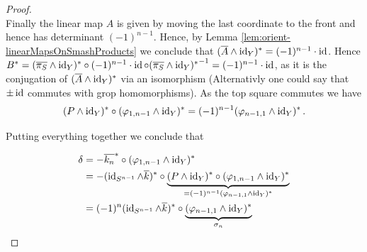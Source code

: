 \begin{proof}
\begin{equation*}
	\end{equation*}
	 Finally the linear map $A$ is given by moving the last coordinate to the front and hence has determinant $(-1)^{n-1}$.  Hence, by Lemma \ref{lem:orient-linearMapsOnSmashProducts} we conclude that $(\overline{A}\wedge \operatorname{\mathrm{id}}_Y)^*=(-1)^{n-1}\cdot \operatorname{\mathrm{id}}$. Hence $B^*=(\overline{\pi_S}\wedge \operatorname{\mathrm{id}}_Y)^*\circ (-1)^{n-1}\cdot \operatorname{\mathrm{id}}\circ {(\overline{\pi_S}\wedge \operatorname{\mathrm{id}}_Y)^*}^{-1}=(-1)^{n-1}\cdot \operatorname{\mathrm{id}}$, as it is the conjugation of $(\overline{A}\wedge \operatorname{\mathrm{id}}_Y)^*$ via an isomorphism (Alternativly one could say that $\pm \operatorname{\mathrm{id}}$ commutes with grop homomorphisms). As the top square commutes we have
	\begin{equation*}
		 (P\wedge \operatorname{\mathrm{id}}_Y)^*\circ (\varphi_{1,n-1}\wedge \operatorname{\mathrm{id}}_Y)^*=(-1)^{n-1}(\varphi_{n-1,1}\wedge \operatorname{\mathrm{id}}_Y)^*\,.
	\end{equation*} 
	
	Putting everything together we conclude that 
	
	\begin{align*}
		\delta 
		&=-\overline{k_n}^*\circ (\varphi_{1,n-1}\wedge \operatorname{\mathrm{id}}_Y)^* \\
		&=-(\operatorname{\mathrm{id}}_{S^{n-1}} \wedge \overline{k})^*\circ \underbrace{(P\wedge \operatorname{\mathrm{id}}_Y)^*\circ  (\varphi_{1,n-1}\wedge \operatorname{\mathrm{id}}_Y)^*}_{=(-1)^{n-1}(\varphi_{n-1,1}\wedge \operatorname{\mathrm{id}}_Y)^*}\\
		&=(-1)^{n}(\operatorname{\mathrm{id}}_{S^{n-1}}\wedge \overline{k})^*\circ \underbrace{(\varphi_{n-1,1}\wedge \operatorname{\mathrm{id}}_Y)^*}_{\sigma_n}
	\end{align*}

\end{proof}

